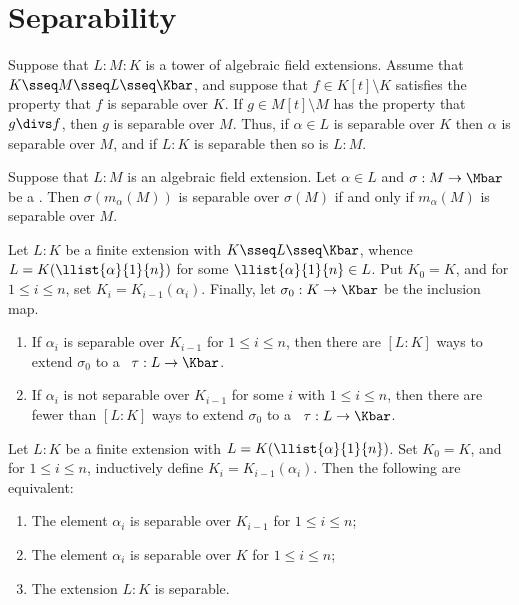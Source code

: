 \documentclass{article}
\begin{document}
\section{Separability}
  \begin{proposition}
    Suppose that $L:M:K$ is a tower of algebraic field extensions. Assume that $K\sseq M\sseq L\sseq \Kbar$, and suppose that $f\in K[t]\setminus K$ satisfies the property that $f$ is separable over $K$. If $g\in M[t]\setminus M$ has the property that $g\divs f$, then $g$ is separable over $M$. Thus, if $\alpha\in L$ is separable over $K$ then $\alpha$ is separable over $M$, and if $L:K$ is separable then so is $L:M$.
  \end{proposition}

  \begin{proposition}
    Suppose that $L:M$ is an algebraic field extension. Let $\alpha\in L$ and $\sigma:M\to\Mbar$ be a \homo. Then $\sigma(m_\alpha(M))$ is separable over $\sigma(M)$ if and only if $m_\alpha(M)$ is separable over $M$.
  \end{proposition}

  \begin{theorem}
    Let $L:K$ be a finite extension with $K\sseq L\sseq \Kbar$, whence $L=K(\llist{\alpha}{1}{n})$ for some $\llist{\alpha}{1}{n}\in L$. Put $K_0=K$, and for $1\leq i\leq n$, set $K_i=K_{i-1}(\alpha_i)$. Finally, let $\sigma_0:K\to\Kbar$ be the inclusion map.
    \begin{enumerate}[label=(\roman*)]
      \item If $\alpha_i$ is separable over $K_{i-1}$ for $1\leq i\leq n$, then there are $[L:K]$ ways to extend $\sigma_0$ to a \homo~$\tau:L\to\Kbar$.
      \item If $\alpha_i$ is not separable over $K_{i-1}$ for some $i$ with $1\leq i\leq n$, then there are fewer than $[L:K]$ ways to extend $\sigma_0$ to a \homo~$\tau:L\to\Kbar$.
    \end{enumerate}
  \end{theorem}

  \begin{theorem}
    Let $L:K$ be a finite extension with $L=K(\llist{\alpha}{1}{n})$. Set $K_0=K$, and for $1\leq i\leq n$, inductively define $K_i=K_{i-1}(\alpha_i)$. Then the following are equivalent:
    \begin{enumerate}[label=(\roman*)]
      \item The element $\alpha_i$ is separable over $K_{i-1}$ for $1\leq i\leq n$;
      \item The element $\alpha_i$ is separable over $K$ for $1\leq i\leq n$;
      \item The extension $L:K$ is separable.
    \end{enumerate}
  \end{theorem}
\end{document}
